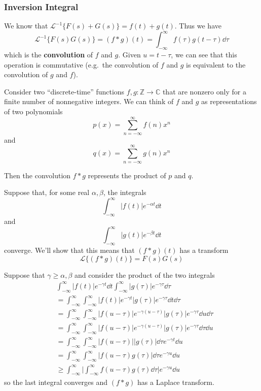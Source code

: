 \documentclass[12pt]{article}
\begin{document}
\subsubsection{Inversion Integral}
We know that $\mathcal{L} ^{-1} \{ F(s) + G(s) \} = f(t) + g(t)$. Thus we have \[ \mathcal{L}^{-1} \{ F(s)G(s) \} = (f * g)(t) = \int_{-\infty}^\infty f(\tau)g(t-\tau) \dd\tau \] which is the {\bf convolution} of $f$ and $g$. Given $u = t - \tau$, we can see that this operation is commutative (e.g.\ the convolution of $f$ and $g$ is equivalent to the convolution of $g$ and $f$).

Consider two ``discrete-time'' functions $f,g : \mathbb{Z} \to \mathbb{C}$ that are nonzero only for a finite number of nonnegative integers. We can think of $f$ and $g$ as representations of two polynomials \[ p(x) = \sum_{n=-\infty}^\infty f(n)x^n \] and \[ q(x) = \sum_{n=-\infty}^\infty g(n) x^n \]

Then the convolution $f * g$ represents the product of $p$ and $q$.

Suppose that, for some real $\alpha, \beta$, the integrals \[ \int_{-\infty}^\infty |f(t)| e^{-\alpha t} \dd t \] and \[ \int_{-\infty}^\infty |g(t)| e^{-\beta t} \dd t \] converge. We'll show that this means that $(f * g)(t)$ has a transform \[ \mathcal{L} \{ (f*g)(t) \} = F(s)G(s) \]

Suppose that $\gamma \geq \alpha, \beta$ and consider the product of the two integrals
\begin{align*}
&\int_{-\infty}^\infty |f(t)| e^{-\gamma t} \dd t \int_{-\infty}^\infty |g(\tau)| e^{-\gamma \tau} \dd \tau\\
&= \int_{-\infty}^\infty \int_{-\infty}^\infty |f(t)|e^{-\gamma t} |g(\tau)|e^{-\gamma \tau} \dd t \dd \tau\\
&= \int_{-\infty}^\infty\int_{-\infty}^\infty |f(u-\tau)|e^{-\gamma(u-\tau)} |g(\tau)|e^{-\gamma \tau} \dd u \dd \tau\\
&= \int_{-\infty}^\infty \int_{-\infty}^\infty |f(u-\tau)|e^{-\gamma(u-\tau)} |g(\tau)| e^{-\gamma \tau} \dd \tau \dd u\\
&= \int_{-\infty}^\infty \int_{-\infty}^\infty |f(u-\tau)| |g(\tau)| \dd \tau e^{-\gamma t} \dd u \\
&= \int_{-\infty}^\infty \int_{-\infty}^\infty |f(u-\tau) g(\tau)| \dd \tau e^{-\gamma u} \dd u\\
&\geq \int_{-\infty}^\infty \bigg| \int_{-\infty}^\infty f(u-\tau)g(\tau) \dd \tau \bigg| e^{-\gamma u} \dd u
\end{align*}
so the last integral converges and $(f * g)$ has a Laplace transform.
\end{document}
